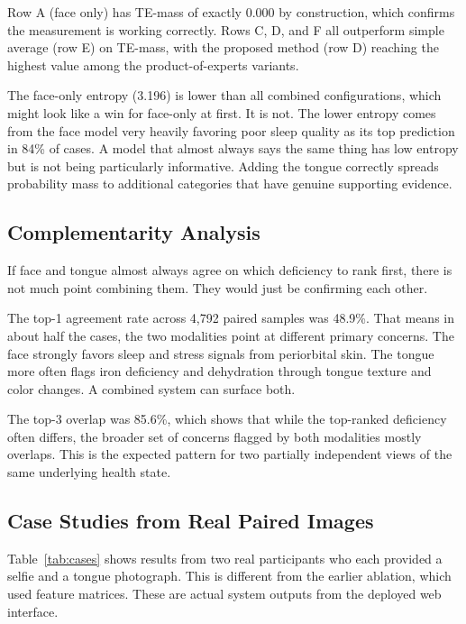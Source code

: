 \documentclass[journal]{IEEEtran}
\begin{document}
Row A (face only) has TE-mass of exactly 0.000 by construction, which confirms
the measurement is working correctly. Rows C, D, and F all outperform simple
average (row E) on TE-mass, with the proposed method (row D) reaching the
highest value among the product-of-experts variants.

The face-only entropy (3.196) is lower than all combined configurations, which
might look like a win for face-only at first. It is not. The lower entropy comes
from the face model very heavily favoring poor sleep quality as its top prediction
in 84\% of cases. A model that almost always says the same thing has low entropy
but is not being particularly informative. Adding the tongue correctly spreads
probability mass to additional categories that have genuine supporting evidence.

\subsection{Complementarity Analysis}

If face and tongue almost always agree on which deficiency to rank first, there
is not much point combining them. They would just be confirming each other.

The top-1 agreement rate across 4{,}792 paired samples was 48.9\%.
That means in about half the cases, the two modalities point at different primary
concerns. The face strongly favors sleep and stress signals from periorbital skin.
The tongue more often flags iron deficiency and dehydration through tongue texture
and color changes. A combined system can surface both.

The top-3 overlap was 85.6\%, which shows that while the top-ranked deficiency
often differs, the broader set of concerns flagged by both modalities mostly
overlaps. This is the expected pattern for two partially independent views of
the same underlying health state.

\subsection{Case Studies from Real Paired Images}

Table~\ref{tab:cases} shows results from two real participants who each provided
a selfie and a tongue photograph. This is different from the earlier ablation,
which used feature matrices. These are actual system outputs from the deployed
web interface.
\end{document}
